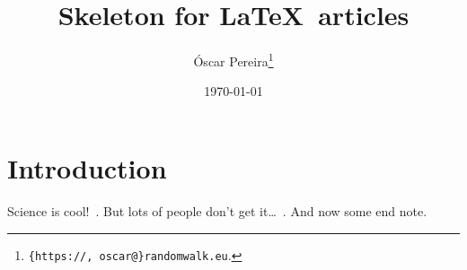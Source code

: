 \documentclass[a4paper,12pt,dvipsnames*]{report}
\title{
Skeleton for \LaTeX\ articles  %
}
\author{
  {Óscar Pereira}\footnote{\texttt{\{https://, oscar@\}randomwalk.eu}.}
}
\date{\today}
\begin{document}
\maketitle

\tableofcontents

\chapter{Introduction}
\label{chap:intro}
Science is cool!~\cite{Sagan}. But lots of people don't get it\ldots~\cite{Feynman74}. And now some end note.

\iffootnotesonly
\else
  \clearpage
  \printendnotes
\fi

\clearpage
{}
{}


\end{document}
